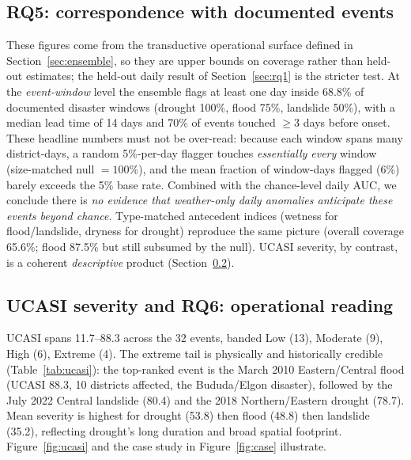 \documentclass[preprint,12pt]{elsarticle}
\begin{document}
\subsection{RQ5: correspondence with documented events}
\label{sec:rq5}
These figures come from the transductive operational surface defined in
Section~\ref{sec:ensemble}, so they are upper bounds on coverage rather than
held-out estimates; the held-out daily result of Section~\ref{sec:rq1} is the
stricter test.
At the \emph{event-window} level the ensemble flags at least one day inside 68.8\%
of documented disaster windows (drought 100\%, flood 75\%, landslide 50\%),
with a median lead time of 14 days and 70\% of events touched $\geq$3 days
before onset. These headline numbers must not be over-read: because each window
spans many district-days, a random 5\%-per-day flagger touches
\emph{essentially every} window (size-matched null $=100\%$), and the mean
fraction of window-days flagged (6\%) barely exceeds the 5\% base rate. Combined
with the chance-level daily AUC, we conclude there is \emph{no evidence that
weather-only daily anomalies anticipate these events beyond chance}. Type-matched
antecedent indices (wetness for flood/landslide, dryness for drought) reproduce
the same picture (overall coverage 65.6\%; flood 87.5\% but still subsumed by
the null). UCASI severity, by contrast, is a coherent \emph{descriptive} product
(Section~\ref{sec:rq6}).

\subsection{UCASI severity and RQ6: operational reading}
\label{sec:rq6}
UCASI spans 11.7--88.3 across the 32 events, banded Low (13), Moderate (9),
High (6), Extreme (4). The extreme tail is physically and historically credible
(Table~\ref{tab:ucasi}): the top-ranked event is the March 2010
Eastern/Central flood (UCASI 88.3, 10 districts affected, the Bududa/Elgon
disaster), followed by the July 2022 Central landslide (80.4) and the 2018
Northern/Eastern drought (78.7). Mean severity is highest for drought (53.8)
then flood (48.8) then landslide (35.2), reflecting drought's long duration and
broad spatial footprint. Figure~\ref{fig:ucasi} and the case study in
Figure~\ref{fig:case} illustrate.
\end{document}
